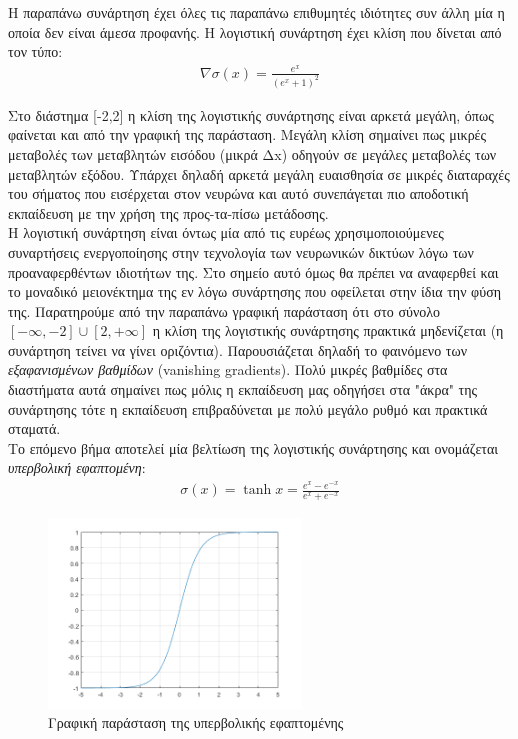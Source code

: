 \documentclass[11pt]{article} %
\numberwithin{equation}{subsection}
\begin{document}
Η παραπάνω συνάρτηση έχει όλες τις παραπάνω επιθυμητές ιδιότητες συν άλλη μία η οποία δεν είναι άμεσα προφανής. H λογιστική συνάρτηση έχει κλίση που δίνεται από τον τύπο:
\begin{align*}
\nabla \sigma(x) = \frac{e^x}{(e^x + 1)^2}
\end{align*}

 Στο διάστημα [-2,2] η κλίση της λογιστικής συνάρτησης είναι αρκετά μεγάλη, όπως φαίνεται και από την γραφική της παράσταση. Μεγάλη κλίση σημαίνει πως μικρές μεταβολές των μεταβλητών εισόδου (μικρά Δx) οδηγούν σε μεγάλες μεταβολές των μεταβλητών εξόδου. Υπάρχει δηλαδή αρκετά μεγάλη ευαισθησία σε μικρές διαταραχές του σήματος που εισέρχεται στον νευρώνα και αυτό συνεπάγεται πιο αποδοτική εκπαίδευση με την χρήση της προς-τα-πίσω μετάδοσης. \\

Η λογιστική συνάρτηση είναι όντως μία από τις ευρέως χρησιμοποιούμενες συναρτήσεις ενεργοποίησης στην τεχνολογία των νευρωνικών δικτύων λόγω των προαναφερθέντων ιδιοτήτων της. Στο σημείο αυτό όμως θα πρέπει να αναφερθεί και το μοναδικό μειονέκτημα της εν λόγω συνάρτησης που οφείλεται στην ίδια την φύση της. Παρατηρούμε από την παραπάνω γραφική παράσταση ότι στο σύνολο $[-\infty,-2] \cup [2, +\infty]$ η κλίση της λογιστικής συνάρτησης πρακτικά μηδενίζεται (η συνάρτηση τείνει να γίνει οριζόντια). Παρουσιάζεται δηλαδή το φαινόμενο των \textit{εξαφανισμένων βαθμίδων} (vanishing gradients). Πολύ μικρές βαθμίδες στα διαστήματα αυτά σημαίνει πως μόλις η εκπαίδευση μας οδηγήσει στα "άκρα" της συνάρτησης τότε η εκπαίδευση επιβραδύνεται με πολύ μεγάλο ρυθμό και πρακτικά σταματά.\\

Το επόμενο βήμα αποτελεί μία βελτίωση της λογιστικής συνάρτησης και ονομάζεται \textit{υπερβολική εφαπτομένη}:
\begin{align*}
\sigma(x) = \tanh{x} = \frac{e^x - e^{-x}}{e^x + e^{-x}}
\end{align*}

\begin{figure}[h]
    \centering
    \includegraphics[width=0.6\textwidth]{tanh}
    \caption{Γραφική παράσταση της υπερβολικής εφαπτομένης}
    \label{fig:tanh curve}
\end{figure}
\end{document}

